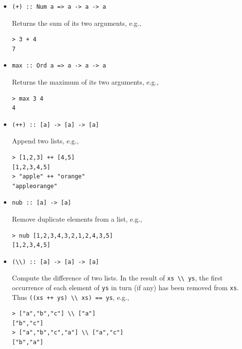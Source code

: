 \documentclass[addpoints]{exam}
\begin{document}
\begin{itemize}
\item
\begin{verbatim}
(+) :: Num a => a -> a -> a
\end{verbatim}
Returns the sum of its two arguments, e.g.,
\begin{verbatim}
> 3 + 4
7
\end{verbatim}
\item
\begin{verbatim}
max :: Ord a => a -> a -> a
\end{verbatim}
Returns the maximum of its two arguments, e.g.,
\begin{verbatim}
> max 3 4
4
\end{verbatim}
\item
\begin{verbatim}
(++) :: [a] -> [a] -> [a]
\end{verbatim}
Append two lists, e.g.,
\begin{verbatim}
> [1,2,3] ++ [4,5]
[1,2,3,4,5]
> "apple" ++ "orange"
"appleorange"
\end{verbatim}
\item 
\begin{verbatim}
nub :: [a] -> [a]
\end{verbatim}
Remove duplicate elements from a list, e.g.,
\begin{verbatim}
> nub [1,2,3,4,3,2,1,2,4,3,5]
[1,2,3,4,5]
\end{verbatim}
\item
\begin{verbatim}
(\\) :: [a] -> [a] -> [a]
\end{verbatim}
Compute the difference of two lists. In the result of \verb|xs \\ ys|, the first occurrence of each element of \texttt{ys} in turn (if any) has been removed from \texttt{xs}.  Thus \verb|((xs ++ ys) \\ xs) == ys|, e.g.,
\begin{verbatim}
> ["a","b","c"] \\ ["a"]
["b","c"]
> ["a","b","c","a"] \\ ["a","c"]
["b","a"]
\end{verbatim}
\end{itemize}
\end{document}
